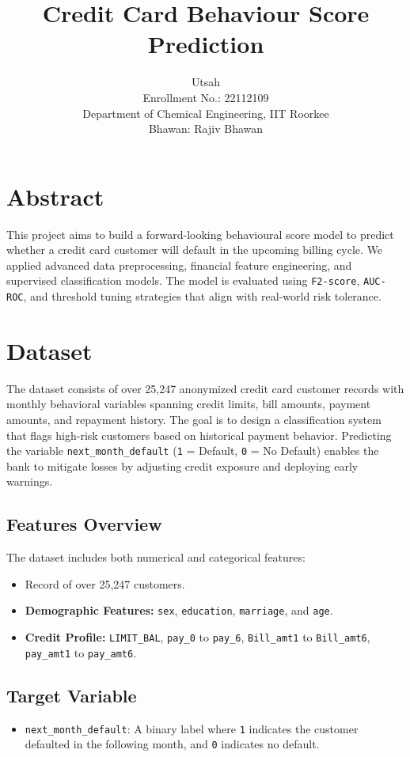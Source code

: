 \documentclass[12pt,a4paper]{article}
\title{\textbf{Credit Card Behaviour Score Prediction}}
\author{
    Utsah \\ 
    Enrollment No.: 22112109 \\ 
    Department of Chemical Engineering, IIT Roorkee \\
    Bhawan: Rajiv Bhawan
}
\date{}
\begin{document}
\maketitle

\section*{Abstract}
This project aims to build a forward-looking behavioural score model to predict whether a credit card customer will default in the upcoming billing cycle. We applied advanced data preprocessing, financial feature engineering, and supervised classification models. The model is evaluated using \texttt{F2-score}, \texttt{AUC-ROC}, and threshold tuning strategies that align with real-world risk tolerance.

\section{Dataset}
The dataset consists of over 25,247 anonymized credit card customer records with monthly behavioral variables spanning credit limits, bill amounts, payment amounts, and repayment history. The goal is to design a classification system that flags high-risk customers based on historical payment behavior. Predicting the variable \texttt{next\_month\_default} (\texttt{1} = Default, \texttt{0} = No Default) enables the bank to mitigate losses by adjusting credit exposure and deploying early warnings.

\subsection*{Features Overview}
The dataset includes both numerical and categorical features:
\begin{itemize}
    \item Record of over 25,247 customers.
    \item \textbf{Demographic Features:} \texttt{sex}, \texttt{education}, \texttt{marriage}, and \texttt{age}.
    \item \textbf{Credit Profile:} \texttt{LIMIT\_BAL}, \texttt{pay\_0} to \texttt{pay\_6}, \texttt{Bill\_amt1} to \texttt{Bill\_amt6}, \texttt{pay\_amt1} to \texttt{pay\_amt6}.
\end{itemize}

\subsection*{Target Variable}
\begin{itemize}
    \item \texttt{next\_month\_default}: A binary label where \texttt{1} indicates the customer defaulted in the following month, and \texttt{0} indicates no default.
\end{itemize}
\end{document}
